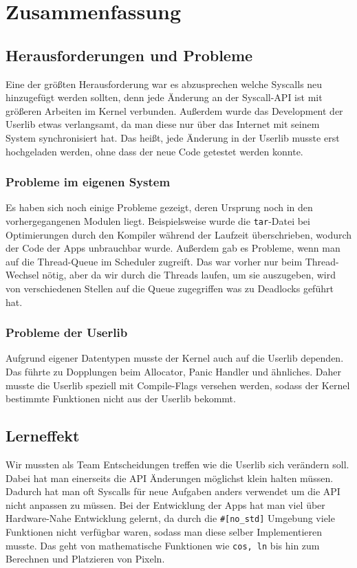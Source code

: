 \section{Zusammenfassung}

\subsection{Herausforderungen und Probleme}
    Eine der größten Herausforderung war es abzusprechen welche Syscalls neu hinzugefügt werden sollten, denn jede Änderung an der Syscall-API ist mit größeren Arbeiten im Kernel verbunden. Außerdem wurde das Development der Userlib etwas verlangsamt, da man diese nur über das Internet mit seinem System synchronisiert hat. Das heißt, jede Änderung in der Userlib musste erst hochgeladen werden, ohne dass der neue Code getestet werden konnte.

    \subsubsection{Probleme im eigenen System}
        Es haben sich noch einige Probleme gezeigt, deren Ursprung noch in den vorhergegangenen Modulen liegt. Beispielsweise wurde die \verb|tar|-Datei bei Optimierungen durch den Kompiler während der Laufzeit überschrieben, wodurch der Code der Apps unbrauchbar wurde. \newline
        Außerdem gab es Probleme, wenn man auf die Thread-Queue im Scheduler zugreift. Das war vorher nur beim Thread-Wechsel nötig, aber da wir durch die Threads laufen, um sie auszugeben, wird von verschiedenen Stellen auf die Queue zugegriffen was zu Deadlocks geführt hat.


    \subsubsection{Probleme der Userlib}
        Aufgrund eigener Datentypen musste der Kernel auch auf die Userlib dependen. Das führte zu Dopplungen beim Allocator, Panic Handler und ähnliches. Daher musste die Userlib speziell mit Compile-Flags versehen werden, sodass der Kernel bestimmte Funktionen nicht aus der Userlib bekommt.


\subsection{Lerneffekt}
    Wir mussten als Team Entscheidungen treffen wie die Userlib sich verändern soll. Dabei hat man einerseits die API Änderungen möglichst klein halten müssen. Dadurch hat man oft Syscalls für neue Aufgaben anders verwendet um die API nicht anpassen zu müssen. \newline
    Bei der Entwicklung der Apps hat man viel über Hardware-Nahe Entwicklung gelernt, da durch die \verb|#[no_std]| Umgebung viele Funktionen nicht verfügbar waren, sodass man diese selber Implementieren musste. Das geht von mathematische Funktionen wie \verb|cos, ln| bis hin zum Berechnen und Platzieren von Pixeln.
